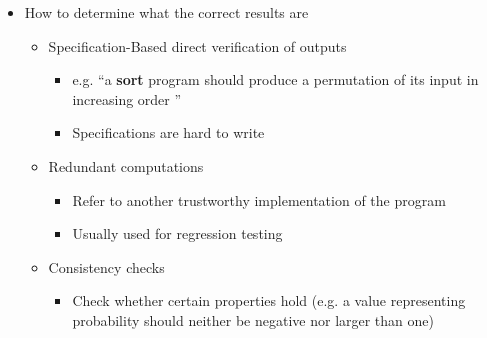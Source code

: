 \documentclass[11pt]{article}
\begin{document}
\begin{itemize}
\begin{itemize}
			\item How to determine what the correct results are
			\begin{itemize}
				\item Specification-Based direct verification of outputs
				\begin{itemize}
					\item e.g. “a \textbf{sort} program should produce a permutation of its input in increasing order ”
					\item Specifications are hard to write
				\end{itemize}
			\item Redundant computations
				\begin{itemize}
					\item Refer to another trustworthy implementation of the program
					\item Usually used for regression testing
				\end{itemize}
			\item Consistency checks
				\begin{itemize}
					\item Check whether certain properties hold (e.g. a value representing probability
					should neither be negative nor larger than one)
				\end{itemize}
			\end{itemize}
		\end{itemize}
\end{itemize}

\newpage
\end{document}
